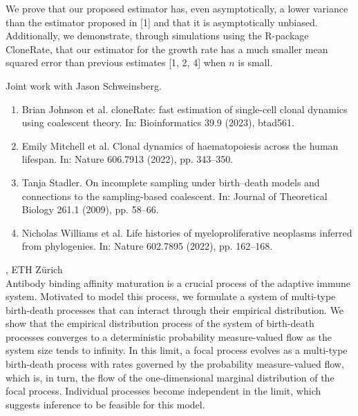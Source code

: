 \documentclass[12pt,a4paper]{article}
\begin{document}
 We prove that our proposed estimator has, even asymptotically, a lower variance than the estimator proposed in [1] and that it is asymptotically unbiased. Additionally, we demonstrate, through simulations using the R-package CloneRate, that our estimator for the growth rate has a much smaller mean squared error than previous estimates [1, 2, 4] when $n$ is small. 

 Joint work with Jason Schweinsberg. 

 \begin{enumerate} \item Brian Johnson et al. cloneRate: fast estimation of single-cell clonal dynamics using coalescent theory. In: Bioinformatics 39.9 (2023), btad561. \item Emily Mitchell et al. Clonal dynamics of haematopoiesis across the human lifespan. In: Nature 606.7913 (2022), pp. 343–350. \item Tanja Stadler. On incomplete sampling under birth–death models and connections to the sampling-based coalescent. In: Journal of Theoretical Biology 261.1 (2009), pp. 58–66. \item Nicholas Williams et al. Life histories of myeloproliferative neoplasms inferred from phylogenies. In: Nature 602.7895 (2022), pp. 162–168. \end{enumerate} 

\bigskip\bigskip

, ETH Zürich \\[2ex] Antibody binding affinity maturation is a crucial process of the adaptive immune system. Motivated to model this process, we formulate a system of multi-type birth-death processes that can interact through their empirical distribution. We show that the empirical distribution process of the system of birth-death processes converges to a deterministic probability measure-valued flow as the system size tends to infinity. In this limit, a focal process evolves as a multi-type birth-death process with rates governed by the probability measure-valued flow, which is, in turn, the flow of the one-dimensional marginal distribution of the focal process. Individual processes become independent in the limit, which suggests inference to be feasible for this model. 
\end{document}
